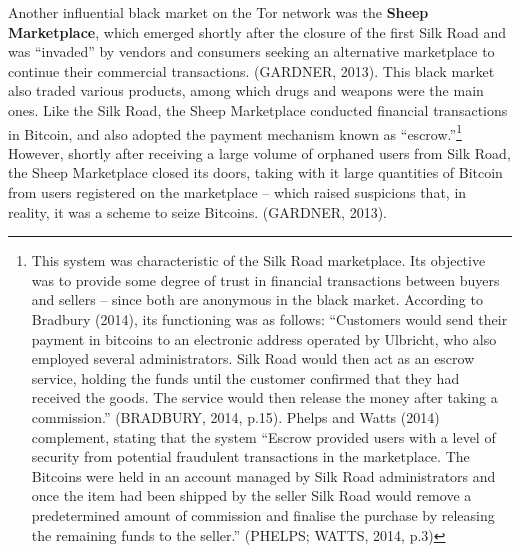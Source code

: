 Another influential black market on the Tor network was the \textbf{Sheep Marketplace}, which emerged shortly after the closure of the first Silk Road and was ``invaded'' by vendors and consumers seeking an alternative marketplace to continue their commercial transactions. (GARDNER, 2013). This black market also traded various products, among which drugs and weapons were the main ones. Like the Silk Road, the Sheep Marketplace conducted financial transactions in Bitcoin, and also adopted the payment mechanism known as ``escrow.''\footnote{This system was characteristic of the Silk Road marketplace. Its objective was to provide some degree of trust in financial transactions between buyers and sellers -- since both are anonymous in the black market. According to Bradbury (2014), its functioning was as follows: ``Customers would send their payment in bitcoins to an electronic address operated by Ulbricht, who also employed several administrators. Silk Road would then act as an escrow service, holding the funds until the customer confirmed that they had received the goods. The service would then release the money after taking a commission.'' (BRADBURY, 2014, p.15). Phelps and Watts (2014) complement, stating that the system ``Escrow provided users with a level of security from potential fraudulent transactions in the marketplace. The Bitcoins were held in an account managed by Silk Road administrators and once the item had been shipped by the seller Silk Road would remove a predetermined amount of commission and finalise the purchase by releasing the remaining funds to the seller.'' (PHELPS; WATTS, 2014, p.3)} However, shortly after receiving a large volume of orphaned users from Silk Road, the Sheep Marketplace closed its doors, taking with it large quantities of Bitcoin from users registered on the marketplace -- which raised suspicions that, in reality, it was a scheme to seize Bitcoins. (GARDNER, 2013).

